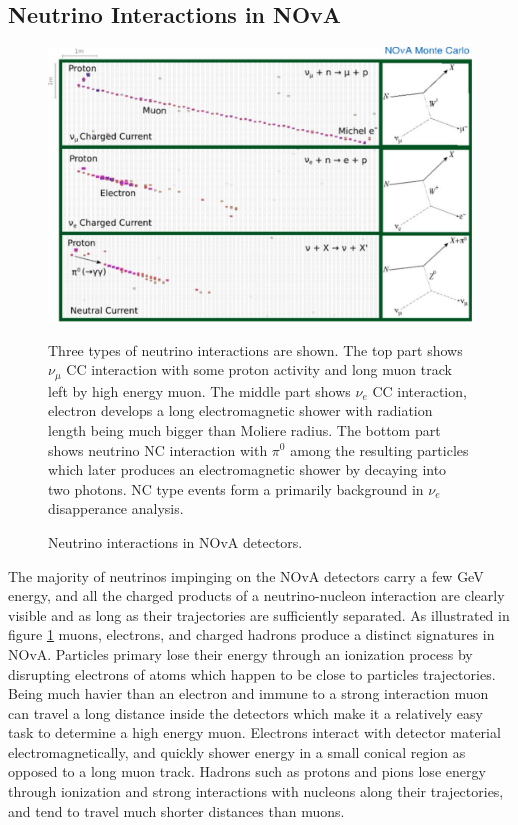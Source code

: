 \subsection{Neutrino Interactions in NOvA}
\begin{figure}
\includegraphics[width=1.0\textwidth]{figures/Det_topologies.pdf}\\%
\caption{Neutrino interactions in NOvA detectors.}
{Three types of neutrino interactions are shown. The top part shows $\nu_\mu$ CC interaction with some
proton activity and long muon track left by high energy muon. The middle part shows $\nu_e$ CC interaction,
electron develops a long electromagnetic shower with radiation length being much bigger than Moliere radius.
The bottom part shows neutrino NC interaction with $\pi^0$ among the resulting particles which later produces
an electromagnetic shower by decaying into two photons. NC type events form a primarily background in $\nu_e$
disapperance analysis.} \label{fig:Topologies}
\end{figure}
The majority of neutrinos impinging on the NOvA detectors carry a few GeV energy, and all the charged
products of a neutrino-nucleon interaction are clearly visible and as long as their trajectories are
sufficiently separated. As illustrated in figure \ref{fig:Topologies} muons, electrons, 
and charged hadrons produce a distinct signatures in NOvA. Particles primary lose their energy through an 
ionization 
process by disrupting electrons of atoms which happen to be close to particles trajectories. Being 
much havier than an electron and immune to a strong interaction muon can travel a long distance inside 
the detectors which make it a relatively easy task to determine a high energy muon. Electrons interact
with detector material electromagnetically, and quickly shower energy in a small conical region as opposed to a 
long muon track. Hadrons such as protons and pions lose energy through ionization and strong interactions 
with nucleons along their trajectories, and tend to travel much shorter distances than muons.

